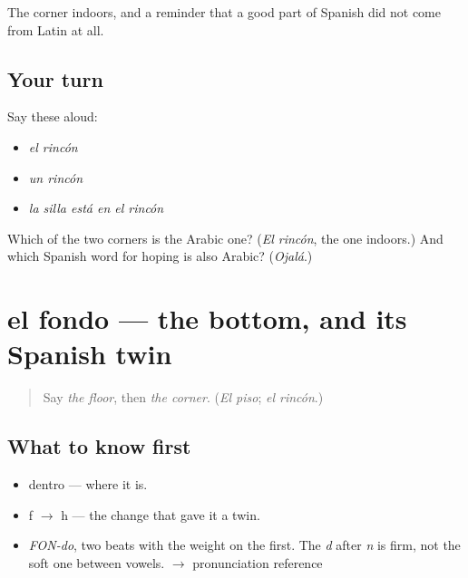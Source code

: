 \begin{grammarlens}[title={What you've built}]
The corner indoors, and a reminder that a good part of Spanish did not come from Latin at all.
\end{grammarlens}

\subsection*{Your turn}
Say these aloud:

\begin{itemize}
\raggedright
  \item \emph{el rincón}
  \item \emph{un rincón}
  \item \emph{la silla está en el rincón}
\end{itemize}

\begin{tcolorbox}[breakable,colback=teal!4,colframe=teal!35!black,title={Before you move on}]
Which of the two corners is the Arabic one? (\emph{El rincón}, the one indoors.) And which Spanish word for hoping is also Arabic? (\emph{Ojalá}.)
\end{tcolorbox}
\section[el fondo]{el fondo — the bottom, and its Spanish twin}

\label{lesson:ES-C355-fondo}



\begin{quote}
Say \emph{the floor}, then \emph{the corner}. (\emph{El piso}; \emph{el rincón}.)
\end{quote}

\subsection*{What to know first}
\begin{itemize}
\raggedright
  \item dentro — where it is.
  \item f $\to$ h — the change that gave it a twin.
\end{itemize}

\begin{sounds}
\begin{itemize}
\raggedright
  \item \emph{FON-do}, two beats with the weight on the first. The \emph{d} after \emph{n} is firm, not the soft one between vowels. $\to$ pronunciation reference
\end{itemize}
\end{sounds}

